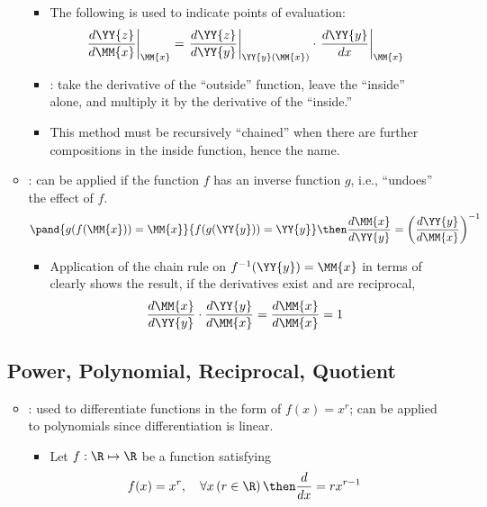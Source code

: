 \begin{itemize}
\begin{itemize}
\begin{itemize}
        \item The following is used to indicate points of evaluation:
        \[
          \left.\frac{d \YY{z}}{d \MM{x}}\right|_\MM{x} = \left. \frac{d
          \YY{z}}{d \YY{y}}\right|_{ \YY{y}\left(\MM{x}  \right) } \cdot
          \left. \frac{d \YY{y}}{dx}\right|_\MM{x}
        \]
        \item {}: take the derivative of the ``outside''
          function, leave the ``inside'' alone, and multiply it by the
          derivative of the ``inside.''
        \item This method must be recursively ``chained'' when there are
          further compositions in the inside function, hence the name.

      \end{itemize}

    \item {}: can be applied if the function \( f \)
      has an inverse function \( g \), i.e., ``undoes'' the effect of \( f \).
      \[
      \pand{g(f(\MM{x})) = \MM{x}}{f(g(\YY{y})) = \YY{y}} \then \frac{d
      \MM{x}}{d \YY{y}} = \left( \frac{d \YY{y}}{d \MM{x}} \right)^{-1}
      \]
      \begin{itemize}
        \item Application of the chain rule on \( f ^{-1}(\YY{y}) = \MM{x} \)
          in terms of  clearly shows the result, if the derivatives
          exist and are reciprocal,
          \[
          \frac{d\MM{x}}{d\YY{y}} \cdot \frac{d\YY{y}}{d\MM{x}} =
          \frac{d\MM{x}}{d\MM{x}} = 1
          \]
      \end{itemize}

  \end{itemize}

  \subsection{Power, Polynomial, Reciprocal, Quotient}
  \begin{itemize}
    \item {}: used to differentiate functions in the form of \(
      f(x) = x^r \); can be applied to polynomials since differentiation is
      linear.
      \begin{itemize}
        \item Let \( f : \R \mapsto \R \) be a function satisfying
        \[
          f(x) = x^r, \quad \forall x \left( r \in \R \right) \then
          \frac{d}{dx} = r x^{r-1}
        \]
      \end{itemize}


\end{itemize}
\end{itemize}

